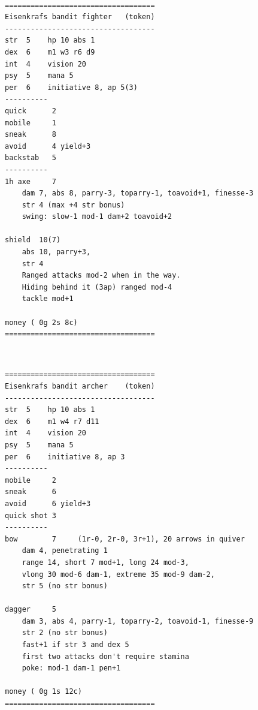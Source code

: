 \

\goodbreak \begin{samepage} \vsmall \begin{verbatim}
===================================
Eisenkrafs bandit fighter   (token)
-----------------------------------
str  5    hp 10 abs 1
dex  6    m1 w3 r6 d9
int  4    vision 20
psy  5    mana 5
per  6    initiative 8, ap 5(3)
----------
quick      2
mobile     1
sneak      8
avoid      4 yield+3
backstab   5
----------
1h axe     7
    dam 7, abs 8, parry-3, toparry-1, toavoid+1, finesse-3
    str 4 (max +4 str bonus)
    swing: slow-1 mod-1 dam+2 toavoid+2

shield  10(7)
    abs 10, parry+3,
    str 4
    Ranged attacks mod-2 when in the way.
    Hiding behind it (3ap) ranged mod-4
    tackle mod+1

money ( 0g 2s 8c)
===================================
\end{verbatim} \normalsize \end{samepage}

\

\goodbreak \begin{samepage} \vsmall \begin{verbatim}
===================================
Eisenkrafs bandit archer    (token)
-----------------------------------
str  5    hp 10 abs 1
dex  6    m1 w4 r7 d11
int  4    vision 20
psy  5    mana 5
per  6    initiative 8, ap 3
----------
mobile     2
sneak      6
avoid      6 yield+3
quick shot 3
----------
bow        7     (1r-0, 2r-0, 3r+1), 20 arrows in quiver
    dam 4, penetrating 1
    range 14, short 7 mod+1, long 24 mod-3,
    vlong 30 mod-6 dam-1, extreme 35 mod-9 dam-2,
    str 5 (no str bonus)

dagger     5
    dam 3, abs 4, parry-1, toparry-2, toavoid-1, finesse-9
    str 2 (no str bonus)
    fast+1 if str 3 and dex 5
    first two attacks don't require stamina
    poke: mod-1 dam-1 pen+1

money ( 0g 1s 12c)
===================================
\end{verbatim} \normalsize \end{samepage}

\

\flushbottom


















